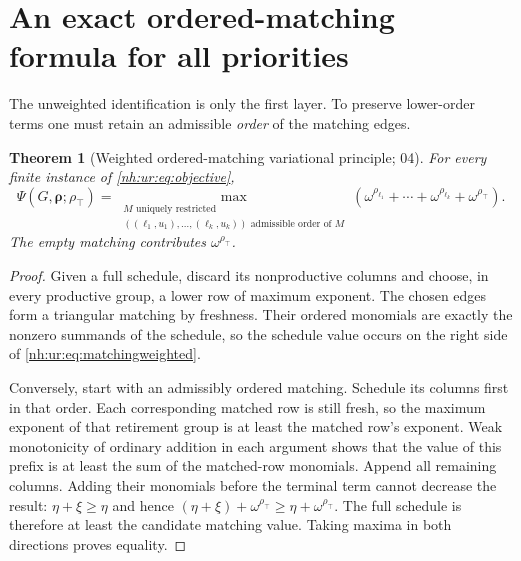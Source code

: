 \documentclass[11pt,a4paper]{article}
\newtheorem{theorem}{Theorem}[section]
\theoremstyle{definition}
\theoremstyle{remark}
\newcommand{\rtop}{\rho_{\top}}
\begin{document}
\section{An exact ordered-matching formula for all priorities}\label{nh:ur:sec:weighted}
\setcounter{equation}{0}

The unweighted identification is only the first layer. To preserve
lower-order terms one must retain an admissible \emph{order} of the matching
edges.

\begin{theorem}[Weighted ordered-matching variational principle; 04]
\label{nh:ur:thm:weighted}
For every finite instance of \eqref{nh:ur:eq:objective},
\begin{equation}\label{nh:ur:eq:matchingweighted}
 \boxed{\displaystyle
 \Psi(G,\boldsymbol\rho;\rtop)=
 \max_{\substack{M\text{ uniquely restricted}\\
                 ((\ell_1,u_1),\ldots,(\ell_k,u_k))\text{ admissible order of }M}}
 \left(\omega^{\rho_{\ell_1}}+\cdots+
       \omega^{\rho_{\ell_k}}+\omega^{\rtop}\right).}
\end{equation}
The empty matching contributes $\omega^{\rtop}$.
\end{theorem}
\begin{proof}
Given a full schedule, discard its nonproductive columns and choose, in every
productive group, a lower row of maximum exponent. The chosen edges form a
triangular matching by freshness. Their ordered monomials are exactly the
nonzero summands of the schedule, so the schedule value occurs on the right
side of \eqref{nh:ur:eq:matchingweighted}.

Conversely, start with an admissibly ordered matching. Schedule its columns
first in that order. Each corresponding matched row is still fresh, so the
maximum exponent of that retirement group is at least the matched row's
exponent. Weak monotonicity of ordinary addition in each argument shows that
the value of this prefix is at least the sum of the matched-row monomials.
Append all remaining columns. Adding their monomials before the terminal term
cannot decrease the result: $\eta+\xi\ge\eta$ and hence
$(\eta+\xi)+\omega^{\rtop}\ge\eta+\omega^{\rtop}$. The full schedule is
therefore at least the candidate matching value. Taking maxima in both
directions proves equality.
\end{proof}
\end{document}
